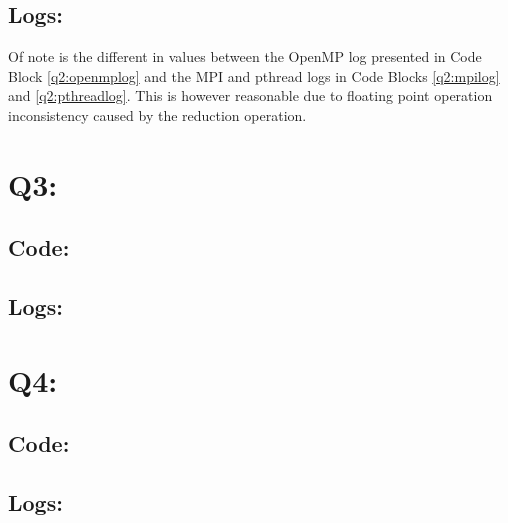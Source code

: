 \documentclass[11pt]{article}
\begin{document}
\subsection*{Logs:}
Of note is the different in values between the OpenMP log presented in Code Block \ref{q2:openmplog} and the MPI and pthread logs in Code Blocks \ref{q2:mpilog} and \ref{q2:pthreadlog}.
This is however reasonable due to floating point operation inconsistency caused by the reduction operation.




\section*{Q3:}

\subsection*{Code:}


\subsection*{Logs:}


\section*{Q4:}

\subsection*{Code:}


\subsection*{Logs:}

\end{document}
